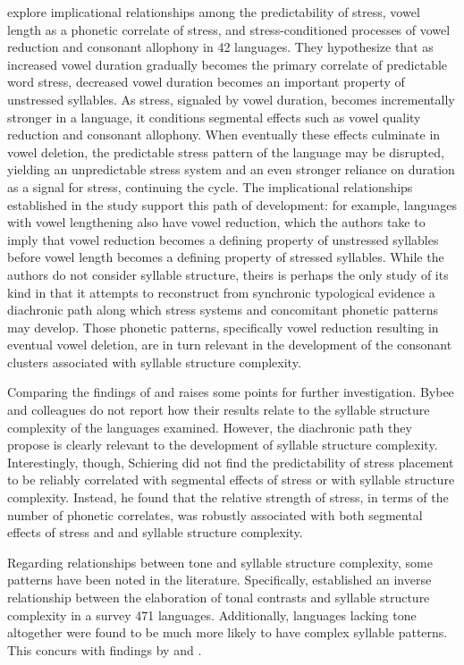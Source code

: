  \citet{BybeeEtAl1998} explore implicational relationships among the predictability of stress, vowel length as a phonetic correlate of stress, and stress-conditioned processes of vowel reduction and consonant allophony in 42 languages. They hypothesize that as increased vowel duration gradually becomes the primary correlate of predictable word stress, decreased vowel duration becomes an important property of unstressed syllables. As stress, signaled by vowel duration, becomes incrementally stronger in a language, it conditions segmental effects such as vowel quality reduction and consonant allophony. When eventually these effects culminate in vowel deletion, the predictable stress pattern of the language may be disrupted, yielding an unpredictable stress system and an even stronger reliance on duration as a signal for stress, continuing the cycle. The implicational relationships established in the study support this path of development: for example, languages with vowel lengthening also have vowel reduction, which the authors take to imply that vowel reduction becomes a defining property of unstressed syllables before vowel length becomes a defining property of stressed syllables. While the authors do not consider syllable structure, theirs is perhaps the only study of its kind in that it attempts to reconstruct from synchronic typological evidence a diachronic path along which stress systems and concomitant phonetic patterns may develop. Those phonetic patterns, specifically vowel reduction resulting in eventual vowel deletion, are in turn relevant in the development of the consonant clusters associated with syllable structure complexity.

  Comparing the findings of \citet{BybeeEtAl1998} and \citet{Schiering2007} raises some points for further investigation. Bybee and colleagues do not report how their results relate to the syllable structure complexity of the languages examined. However, the diachronic path they propose is clearly relevant to the development of syllable structure complexity. Interestingly, though, Schiering did not find the predictability of stress placement to be reliably correlated with segmental effects of stress or with syllable structure complexity. Instead, he found that the relative strength of stress, in terms of the number of phonetic correlates, was robustly associated with both segmental effects of stress and and syllable structure complexity.

  Regarding relationships between tone and syllable structure complexity, some patterns have been noted in the literature. Specifically, \citet{Maddieson2013d} established an inverse relationship between the elaboration of tonal contrasts and syllable structure complexity in a survey 471 languages. Additionally, languages lacking tone altogether were found to be much more likely to have complex syllable patterns. This concurs with findings by \citet{Auer1993} and \citet{Schiering2007}.

